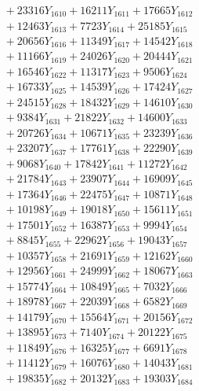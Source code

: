 \documentclass[a4paper,10pt]{article}
\begin{document}
{\begin{align}
&\;  + 23316 Y_{1610} + 16211 Y_{1611} + 17665 Y_{1612} \\[0.3ex]
&\;  + 12463 Y_{1613} + 7723 Y_{1614} + 25185 Y_{1615} \\[0.3ex]
&\;  + 20656 Y_{1616} + 11349 Y_{1617} + 14542 Y_{1618} \\[0.5ex]\allowbreak
&\;  + 11166 Y_{1619} + 24026 Y_{1620} + 20444 Y_{1621} \\[0.3ex]
&\;  + 16546 Y_{1622} + 11317 Y_{1623} + 9506 Y_{1624} \\[0.3ex]
&\;  + 16733 Y_{1625} + 14539 Y_{1626} + 17424 Y_{1627} \\[0.3ex]
&\;  + 24515 Y_{1628} + 18432 Y_{1629} + 14610 Y_{1630} \\[0.3ex]
&\;  + 9384 Y_{1631} + 21822 Y_{1632} + 14600 Y_{1633} \\[0.3ex]
&\;  + 20726 Y_{1634} + 10671 Y_{1635} + 23239 Y_{1636} \\[0.3ex]
&\;  + 23207 Y_{1637} + 17761 Y_{1638} + 22290 Y_{1639} \\[0.3ex]
&\;  + 9068 Y_{1640} + 17842 Y_{1641} + 11272 Y_{1642} \\[0.3ex]
&\;  + 21784 Y_{1643} + 23907 Y_{1644} + 16909 Y_{1645} \\[0.3ex]
&\;  + 17364 Y_{1646} + 22475 Y_{1647} + 10871 Y_{1648} \\[0.5ex]\allowbreak
&\;  + 10198 Y_{1649} + 19018 Y_{1650} + 15611 Y_{1651} \\[0.3ex]
&\;  + 17501 Y_{1652} + 16387 Y_{1653} + 9994 Y_{1654} \\[0.3ex]
&\;  + 8845 Y_{1655} + 22962 Y_{1656} + 19043 Y_{1657} \\[0.3ex]
&\;  + 10357 Y_{1658} + 21691 Y_{1659} + 12162 Y_{1660} \\[0.3ex]
&\;  + 12956 Y_{1661} + 24999 Y_{1662} + 18067 Y_{1663} \\[0.3ex]
&\;  + 15774 Y_{1664} + 10849 Y_{1665} + 7032 Y_{1666} \\[0.3ex]
&\;  + 18978 Y_{1667} + 22039 Y_{1668} + 6582 Y_{1669} \\[0.3ex]
&\;  + 14179 Y_{1670} + 15564 Y_{1671} + 20156 Y_{1672} \\[0.3ex]
&\;  + 13895 Y_{1673} + 7140 Y_{1674} + 20122 Y_{1675} \\[0.3ex]
&\;  + 11849 Y_{1676} + 16325 Y_{1677} + 6691 Y_{1678} \\[0.5ex]\allowbreak
&\;  + 11412 Y_{1679} + 16076 Y_{1680} + 14043 Y_{1681} \\[0.3ex]
&\;  + 19835 Y_{1682} + 20132 Y_{1683} + 19303 Y_{1684} \\[0.3ex]

\end{align}}
\end{document}
